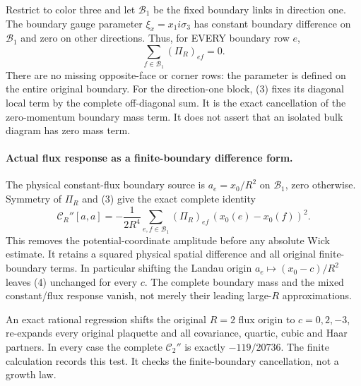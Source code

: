 \documentclass[11pt]{article}
\begin{document}
Restrict to color three and let $\mathcal B_1$ be the fixed boundary
links in direction one. The boundary gauge parameter $\xi_x=x_1i\sigma_3$
has constant boundary difference on $\mathcal B_1$ and zero on other
directions. Thus, for EVERY boundary row $e$,
\[
 \sum_{f\in\mathcal B_1}(\Pi_R)_{ef}=0.                            \tag{3}
\]
There are no missing opposite-face or corner rows: the parameter is
defined on the entire original boundary. For the direction-one block,
(3) fixes its diagonal local term by the complete off-diagonal sum.
It is the exact cancellation of the zero-momentum boundary mass term.
It does not assert that an isolated bulk diagram has zero mass term.

\paragraph{Actual flux response as a finite-boundary difference form.}
The physical constant-flux boundary source is
$a_e=x_0/R^2$ on $\mathcal B_1$, zero otherwise. Symmetry of $\Pi_R$
and (3) give the exact complete identity
\[
 \boxed{\quad
 \mathcal C_R''[a,a]
 =-\frac1{2R^4}\sum_{e,f\in\mathcal B_1}
    (\Pi_R)_{ef}\,(x_0(e)-x_0(f))^2.\quad}                       \tag{4}
\]
This removes the potential-coordinate amplitude before any absolute
Wick estimate. It retains a squared physical spatial difference and
all original finite-boundary terms. In particular shifting the Landau
origin $a_e\mapsto(x_0-c)/R^2$ leaves (4) unchanged for every $c$.
The complete boundary mass and the mixed constant/flux response vanish,
not merely their leading large-$R$ approximations.

An exact rational regression shifts the original $R=2$ flux origin
to $c=0,2,-3$, re-expands every original plaquette and all covariance,
quartic, cubic and Haar partners. In every case the complete
$\mathcal C_2''$ is exactly $-119/20736$.
The finite calculation records this
test. It checks the finite-boundary cancellation, not a growth law.
\end{document}
